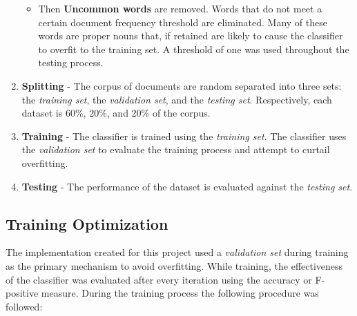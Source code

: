 \documentclass[final,3p,12pt]{elsarticle}
\begin{document}
\begin{enumerate}
\begin{itemize}
            \item Then \textbf{Uncommon words} are removed. Words that do not
                meet a certain document frequency threshold are eliminated.
                Many of these words are proper nouns that, if retained are
                likely to cause the classifier to overfit to the training set.
                A threshold of one was used throughout the testing process.

        \end{itemize}

    \item \textbf{Splitting} - The corpus of documents are random separated
        into three sets: the \textit{training set}, the \textit{validation set},
        and the \textit{testing set}. Respectively, each dataset is 60\%, 20\%,
        and 20\% of the corpus.

    \item \textbf{Training} - The classifier is trained using the
        \textit{training set}.  The classifier uses the \textit{validation set}
        to evaluate the training process and attempt to curtail overfitting.

    \item \textbf{Testing} - The performance of the dataset is evaluated
        against the \textit{testing set}.

\end{enumerate}


\subsection{Training Optimization}
\label{ssection:optimization}

The implementation created for this project used a \textit{validation set} during
training as the primary mechanism to avoid overfitting. While training, the
effectiveness of the classifier was evaluated after every iteration using the
accuracy or F-positive measure. During the training process the following
procedure was followed:
\end{document}
